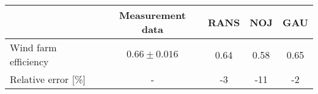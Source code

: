 \begin{tabular}{lcccc}
\hline
		     & Measurement data & RANS & NOJ  &   GAU  \\ 
\hline
Wind farm efficiency & $ 0.66 \pm 0.016 $ &  0.64 &  0.58 &  0.65\\ 
Relative error [\%] & - &    -3 &   -11 &    -2\\ 
\hline
\end{tabular}
